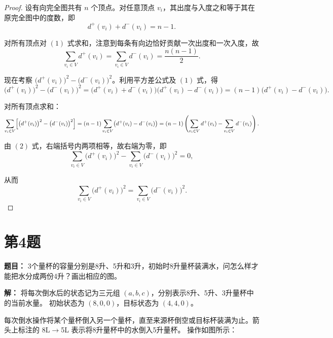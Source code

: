 \documentclass[utf8]{ctexart}
\theoremstyle{mystyle}
\begin{document}
\begin{proof}

设有向完全图共有 $n$ 个顶点。对任意顶点 $v_i$，其出度与入度之和等于其在原完全图中的度数，即
\[
  d^+(v_i) + d^-(v_i) = n - 1. \tag{1}
\]

对所有顶点对 $(1)$ 式求和，注意到每条有向边恰好贡献一次出度和一次入度，故
\[
  \sum_{v_i \in V} d^+(v_i) = \sum_{v_i \in V} d^-(v_i) = \frac{n(n-1)}{2}. \tag{2}
\]

现在考察 $\bigl(d^+(v_i)\bigr)^2 - \bigl(d^-(v_i)\bigr)^2$。利用平方差公式及 $(1)$ 式，得
\[
  \bigl(d^+(v_i)\bigr)^2 - \bigl(d^-(v_i)\bigr)^2
  = \bigl(d^+(v_i) + d^-(v_i)\bigr)\bigl(d^+(v_i) - d^-(v_i)\bigr)
  = (n-1)\bigl(d^+(v_i) - d^-(v_i)\bigr).
\]

对所有顶点求和：
\[
  \sum_{v_i \in V} \Bigl[\bigl(d^+(v_i)\bigr)^2 - \bigl(d^-(v_i)\bigr)^2\Bigr]
  = (n-1) \sum_{v_i \in V} \bigl(d^+(v_i) - d^-(v_i)\bigr)
  = (n-1)\left(\sum_{v_i \in V} d^+(v_i) - \sum_{v_i \in V} d^-(v_i)\right).
\]

由 $(2)$ 式，右端括号内两项相等，故右端为零，即
\[
  \sum_{v_i \in V} \bigl(d^+(v_i)\bigr)^2 - \sum_{v_i \in V} \bigl(d^-(v_i)\bigr)^2 = 0,
\]

从而
\[
  \boxed{\sum_{v_i \in V} \bigl(d^+(v_i)\bigr)^2 = \sum_{v_i \in V} \bigl(d^-(v_i)\bigr)^2.}
\]

\end{proof}

\section*{第4题}
\begin{problembox}
\textbf{题目：} 3个量杯的容量分别是8升、5升和3升，初始时8升量杯装满水，问怎么样才能把水分成两份4升？画出相应的图。
\end{problembox}
\textbf{解：}
将每次倒水后的状态记为三元组 $(a, b, c)$，分别表示8升、5升、3升量杯中的当前水量。
初始状态为 $(8, 0, 0)$，目标状态为 $(4, 4, 0)$。

每次倒水操作将某个量杯倒入另一个量杯，直至来源杯倒空或目标杯装满为止。箭头上标注的 8L$\to$5L 表示将8升量杯中的水倒入5升量杯。
操作如图所示：

\medskip
\end{document}
